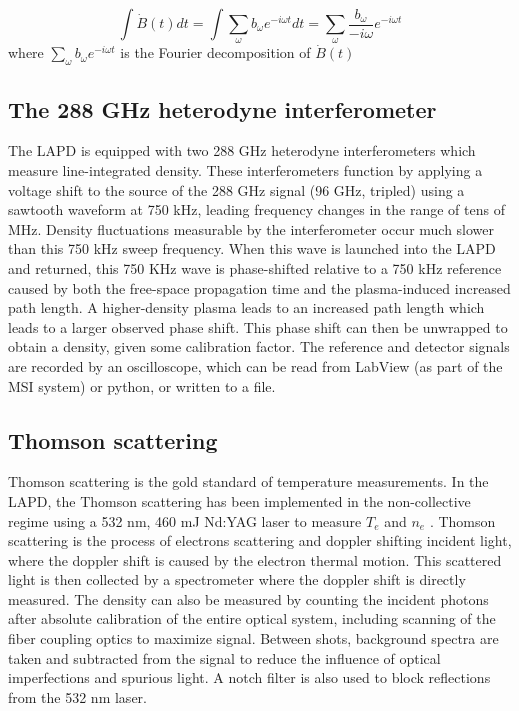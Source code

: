 \begin{equation}
	  \int \dot B(t) dt = \int \sum_\omega b_\omega e^{-i \omega t} dt = \sum_\omega \frac{b_\omega}{-i \omega} e^{-i \omega t}
\end{equation}
where $\sum_\omega b_\omega e^{-i \omega t}$ is the Fourier decomposition of $\dot B(t)$

\subsection{The 288 GHz heterodyne interferometer}

The LAPD is equipped with two 288 GHz heterodyne interferometers which measure line-integrated density. These interferometers function by applying a voltage shift to the source of the 288 GHz signal (96 GHz, tripled) using a sawtooth waveform at 750 kHz, leading frequency changes in the range of tens of MHz. Density fluctuations measurable by the interferometer occur much slower than this 750 kHz sweep frequency. When this wave is launched into the LAPD and returned, this 750 KHz wave is phase-shifted relative to a 750 kHz reference caused by both the free-space propagation time and the plasma-induced increased path length. A higher-density plasma leads to an increased path length which leads to a larger observed phase shift. This phase shift can then be unwrapped to obtain a density, given some calibration factor. The reference and detector signals are recorded by an oscilloscope, which can be read from LabView (as part of the MSI system) or python, or written to a file.

\subsection{Thomson scattering}

Thomson scattering is the gold standard of temperature measurements. In the LAPD, the Thomson scattering has been implemented in the non-collective regime using a 532 nm, 460 mJ Nd:YAG laser to measure $T_e$ and $n_e$ \cite{ghazaryan_thomson_2022}. Thomson scattering is the process of electrons scattering and doppler shifting incident light, where the doppler shift is caused by the electron thermal motion. This scattered light is then collected by a spectrometer where the doppler shift is directly measured. The density can also be measured by counting the incident photons after absolute calibration of the entire optical system, including scanning of the fiber coupling optics to maximize signal. Between shots, background spectra are taken and subtracted from the signal to reduce the influence of optical imperfections and spurious light. A notch filter is also used to block reflections from the 532 nm laser.


